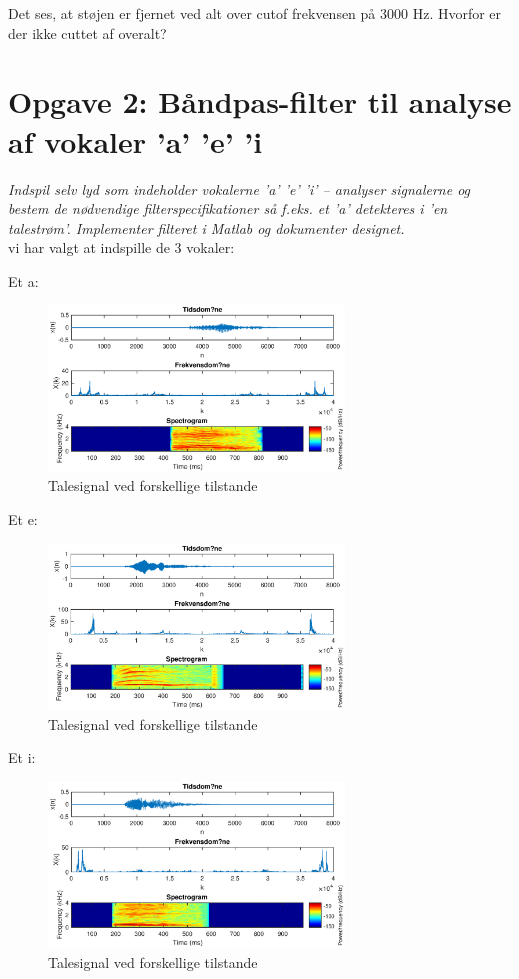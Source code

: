\documentclass[a4paper]{report}
\begin{document}
Det ses, at støjen er fjernet ved alt over cutof frekvensen på 3000 Hz. Hvorfor er der ikke cuttet af overalt? 

\section*{Opgave 2: Båndpas-filter til analyse af vokaler ’a’  ’e’  ’i}
\textit{Indspil selv lyd som indeholder vokalerne ’a’  ’e’  ’i’ – analyser signalerne og bestem de nødvendige filterspecifikationer så f.eks. et ’a’ detekteres i ’en talestrøm’. Implementer filteret i Matlab og dokumenter designet.}\\


vi har valgt at indspille de 3 vokaler: 

Et a: 

\begin{figure}[H] 
\centering
\includegraphics[width=0.7\textwidth]{grafer/opg2_a}
\caption{Talesignal ved forskellige tilstande} \label{opg2_a}
\end{figure}

Et e: 
\begin{figure}[H] 
\centering
\includegraphics[width=0.7\textwidth]{grafer/opg2_e}
\caption{Talesignal ved forskellige tilstande} \label{opg2_e}
\end{figure}

Et i: 
\begin{figure}[H] 
\centering
\includegraphics[width=0.7\textwidth]{grafer/opg2_i}
\caption{Talesignal ved forskellige tilstande} \label{opg2_i}
\end{figure}
\end{document}
